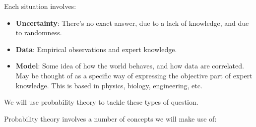 \documentclass[a4paper]{article}
\begin{document}
            \begin{definition}
                Each situation involves:

                \begin{itemize}
                    \item \textbf{Uncertainty}: There's no exact answer, due to
                        a lack of knowledge, and due to randomness.
                    \item \textbf{Data}: Empirical observations and expert
                        knowledge.
                    \item \textbf{Model}: Some idea of how the world behaves,
                        and how data are correlated. May be thought of as a
                        specific way of expressing the objective part of expert
                        knowledge. This is based in physics, biology,
                        engineering, etc.
                \end{itemize}
            \end{definition}

            We will use probability theory to tackle these types of question.

            Probability theory involves a number of concepts we will make use
            of:
\end{document}
